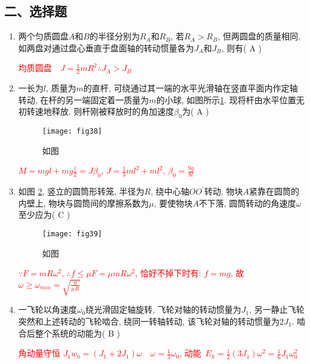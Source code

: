 \subsection*{二、选择题}
\begin{enumerate}
    \item 两个匀质圆盘$A$和$B$的半径分别为$R_A$和$R_B$, 若$R_A>R_B$, 但两圆盘的质量相同, 如两盘对通过盘心垂直于盘面轴的转动惯量各为$J_A$和$J_B$, 则有( A )
    \begin{note}
        \textcolor{red}{均质圆盘\ \ $J=\frac{1}{2}mR^2$\qquad $\therefore J_A>J_B$}
    \end{note}
    \item 一长为$l$, 质量为$m$的直杆, 可绕通过其一端的水平光滑轴在竖直平面内作定轴转动, 在杆的另一端固定着一质量为$m$的小球, 如图所示\ref{Fig:38}. 
    现将杆由水平位置无初转速地释放. 则杆刚被释放时的角加速度$\beta_0$为( A )
    \begin{figure}[H]
        \centering
        \texttt{[image: fig38]}
            \caption{如图}\label{Fig:38}
    \end{figure}
    \begin{note}
        \textcolor{red}{$M=mgl+mg\frac{l}{2}=J\beta_0$, $J=\frac{1}{3}ml^2+ml^2$, $\beta_0=\frac{9g}{8l}$}
    \end{note}
    \item 如图 \ref{Fig:39}, 竖立的圆筒形转笼, 半径为$R$, 绕中心轴$OO^{'}$转动, 物块$A$紧靠在圆筒的内壁上, 物块与圆筒间的摩擦系数为$\mu$, 要使物块$A$不下落, 
    圆筒转动的角速度$\omega$至少应为( C )
    \begin{figure}[H]
        \centering
        \texttt{[image: fig39]}
            \caption{如图}\label{Fig:39}
    \end{figure}
    \begin{note}
        \textcolor{red}{$\because F=mR\omega^2$, $\therefore f \le \mu F=\mu mR\omega^2$, 恰好不掉下时有: $f=mg$, 故$\omega \ge \omega_{min}=\sqrt{\frac{g}{\mu R}}$}
    \end{note}
    \item 一飞轮以角速度$\omega_0$绕光滑固定轴旋转, 飞轮对轴的转动惯量为$J_1$, 另一静止飞轮突然和上述转动的飞轮啮合, 绕同一转轴转动, 该飞轮对轴的转动惯量为$2J_1$. 
    啮合后整个系统的动能为( B )
    \begin{note}
        \textcolor{red}{角动量守恒 $J_1w_0=(J_1+2J_1)\omega$\ \ $\omega=\frac{1}{3}\omega_0$, 动能\ $E_k=\frac{1}{2}(3J_1)\omega^2=\frac{1}{6}J_1\omega_0^2$}
    \end{note}
\end{enumerate}
